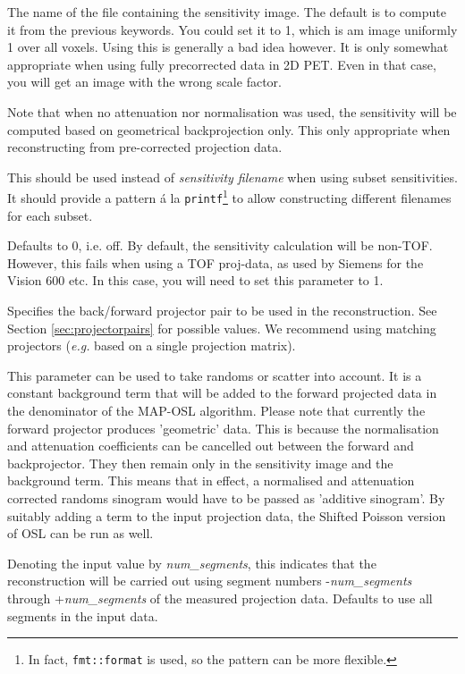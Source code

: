 \documentclass{article}
\begin{document}
\begin{description}
The name of the file containing the sensitivity image. The 
default is to compute it from the previous keywords. You could 
set it to 1, which is am image uniformly 1 over all voxels. 
Using this is generally a bad idea however. It is 
only somewhat appropriate when using fully precorrected data 
in 2D PET. Even in that case, you will get an image with the 
wrong scale factor.

Note that when no attenuation nor normalisation was used, 
the sensitivity will be computed based on geometrical backprojection
only. This only appropriate when reconstructing 
from pre-corrected projection data.

\item[subset sensitivity filenames]
This should be used instead of \textit{sensitivity filename} when using subset
sensitivities. It should provide a pattern \'{a} la \texttt{printf}\footnote{In fact,
\texttt{fmt::format} is used, so the pattern can be more flexible.} to allow
constructing different filenames for each subset.

\item[use time-of-flight sensitivities]
Defaults to 0, i.e. off. By default, the sensitivity calculation will be non-TOF. However,
this fails when using a TOF proj-data, as used by Siemens for the Vision 600 etc. In this case,
you will need to set this parameter to 1.

\item[Projector pair type]
Specifies the back/forward projector pair to be used in the reconstruction. 
See Section \ref{sec:projectorpairs} for possible values. We recommend using matching
projectors (\textit{e.g.} based on a single projection matrix).


\item[additive\_sinogram]
This parameter can be used to take randoms or scatter into account. 
It is a constant background term that will be added to the forward 
projected data in the denominator of the MAP-OSL algorithm. Please 
note that currently the forward projector produces 'geometric' 
data. This is because the normalisation and attenuation coefficients 
can be cancelled out between the forward and backprojector. They 
then remain only in the sensitivity image and the background 
term. This means that in effect, a normalised and attenuation 
corrected randoms sinogram would have to be passed as 'additive 
sinogram'. By suitably adding a term to the input projection 
data, the Shifted Poisson version of OSL can be run as well.


\item[maximum absolute segment number to process]
Denoting the input value by \textit{num\_segments}, this indicates 
that the reconstruction will be carried out using segment numbers 
-\textit{num\_segments} through +\textit{num\_segments} of the measured 
projection data. Defaults to use all segments in the input data.



\end{description}
\end{document}

